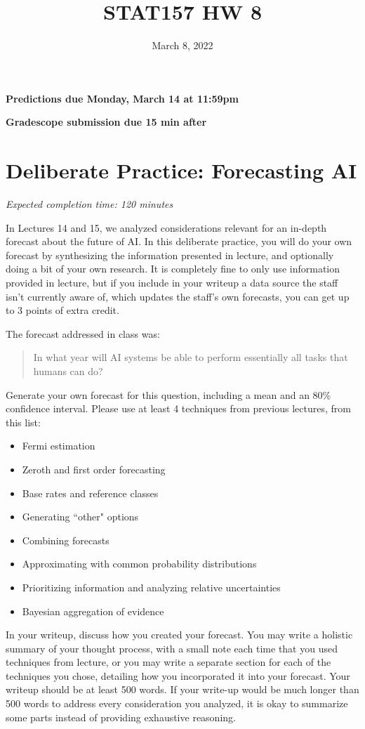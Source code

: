 \documentclass[11pt]{article}
\title{STAT157 HW 8}
\date{March 8, 2022}
\begin{document}
\maketitle

\hfill \textbf{Predictions due Monday, March 14 at 11:59pm}

\hfill \textbf{Gradescope submission due 15 min after}


\section*{Deliberate Practice: Forecasting AI}

\emph{Expected completion time: 120 minutes}

In Lectures 14 and 15, we analyzed considerations relevant for an in-depth forecast about the future of AI. In this deliberate practice, you will do your own forecast by synthesizing the information presented in lecture, and optionally doing a bit of your own research. It is completely fine to only use information provided in lecture, but if you include in your writeup a data source the staff isn't currently aware of, which updates the staff's own forecasts, you can get up to 3 points of extra credit.


The forecast addressed in class was:
\begin{quote}
	In what year will AI systems be able to perform essentially all tasks that humans can do?
\end{quote}
Generate your own forecast for this question, including a mean and an 80\% confidence interval. Please use at least 4 techniques from previous lectures, from this list:
\begin{itemize}
	\item Fermi estimation
	\item Zeroth and first order forecasting
	\item Base rates and reference classes
	\item Generating ``other" options
	\item Combining forecasts
	\item Approximating with common probability distributions
	\item Prioritizing information and analyzing relative uncertainties
	\item Bayesian aggregation of evidence
\end{itemize}

In your writeup, discuss how you created your forecast. You may write a holistic summary of your thought process, with a small note each time that you used techniques from lecture, or you may write a separate section for each of the techniques you chose, detailing how you incorporated it into your forecast. Your writeup should be at least 500 words. If your write-up would be much longer than 500 words to address every consideration you analyzed, it is okay to summarize some parts instead of providing exhaustive reasoning.
\end{document}

